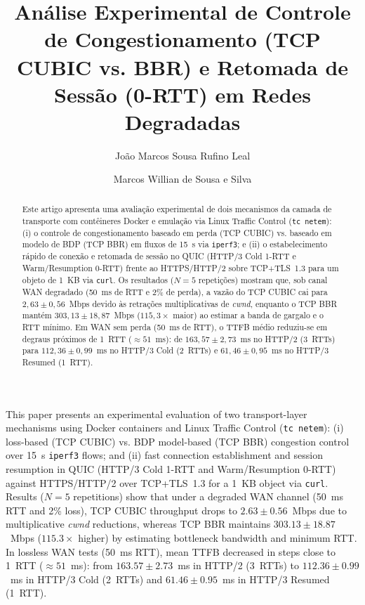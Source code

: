 \documentclass[12pt]{article}
\title{Análise Experimental de Controle de Congestionamento (TCP CUBIC vs. BBR) e Retomada de Sessão (0-RTT) em Redes Degradadas}
\author{João Marcos Sousa Rufino Leal\inst{1} \and Marcos Willian de Sousa e Silva\inst{1}}
\begin{document}
\maketitle

\begin{abstract}
Este artigo apresenta uma avaliação experimental de dois mecanismos da camada de transporte com contêineres Docker e emulação via Linux Traffic Control (\texttt{tc netem}): (i) o controle de congestionamento baseado em perda (TCP CUBIC) vs. baseado em modelo de BDP (TCP BBR) em fluxos de 15~s via \texttt{iperf3}; e (ii) o estabelecimento rápido de conexão e retomada de sessão no QUIC (HTTP/3 Cold 1-RTT e Warm/Resumption 0-RTT) frente ao HTTPS/HTTP/2 sobre TCP+TLS~1.3 para um objeto de 1~KB via \texttt{curl}. Os resultados ($N=5$ repetições) mostram que, sob canal WAN degradado (50~ms de RTT e 2\% de perda), a vazão do TCP CUBIC cai para $2{,}63 \pm 0{,}56$~Mbps devido às retrações multiplicativas de \textit{cwnd}, enquanto o TCP BBR mantém $303{,}13 \pm 18{,}87$~Mbps ($115{,}3\times$ maior) ao estimar a banda de gargalo e o RTT mínimo. Em WAN sem perda (50~ms de RTT), o TTFB médio reduziu-se em degraus próximos de 1~RTT ($\approx 51$~ms): de $163{,}57 \pm 2{,}73$~ms no HTTP/2 (3~RTTs) para $112{,}36 \pm 0{,}99$~ms no HTTP/3 Cold (2~RTTs) e $61{,}46 \pm 0{,}95$~ms no HTTP/3 Resumed (1~RTT).
\end{abstract}

\begin{englishabstract}
This paper presents an experimental evaluation of two transport-layer mechanisms using Docker containers and Linux Traffic Control (\texttt{tc netem}): (i) loss-based (TCP CUBIC) vs. BDP model-based (TCP BBR) congestion control over 15~s \texttt{iperf3} flows; and (ii) fast connection establishment and session resumption in QUIC (HTTP/3 Cold 1-RTT and Warm/Resumption 0-RTT) against HTTPS/HTTP/2 over TCP+TLS~1.3 for a 1~KB object via \texttt{curl}. Results ($N=5$ repetitions) show that under a degraded WAN channel (50~ms RTT and 2\% loss), TCP CUBIC throughput drops to $2.63 \pm 0.56$~Mbps due to multiplicative \textit{cwnd} reductions, whereas TCP BBR maintains $303.13 \pm 18.87$~Mbps ($115.3\times$ higher) by estimating bottleneck bandwidth and minimum RTT. In lossless WAN tests (50~ms RTT), mean TTFB decreased in steps close to 1~RTT ($\approx 51$~ms): from $163.57 \pm 2.73$~ms in HTTP/2 (3~RTTs) to $112.36 \pm 0.99$~ms in HTTP/3 Cold (2~RTTs) and $61.46 \pm 0.95$~ms in HTTP/3 Resumed (1~RTT).
\end{englishabstract}
\end{document}
